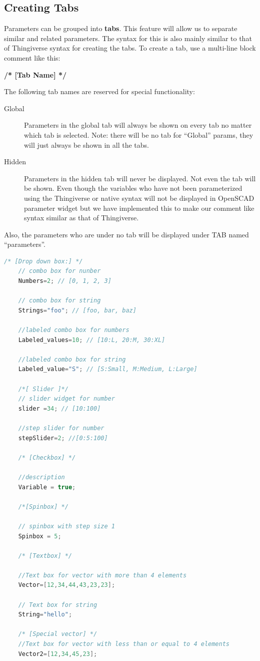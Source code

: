 \subsection{Creating Tabs}
Parameters can be grouped into \textbf{tabs}. This feature will allow us to separate similar and related parameters. The syntax for this is also mainly similar to that of Thingiverse syntax for creating the tabs. To create a tab, use a multi-line block comment like this:

\textbf{/* [Tab Name] */}

The following tab names are reserved for special functionality:
\begin{description}
\item [Global] Parameters in the global tab will always be shown on every tab no matter which tab is selected. Note: there will be no tab for “Global” params, they will just always be shown in all the tabs.

\item [Hidden] Parameters in the hidden tab will never be displayed. Not even the tab will be shown. Even though the variables who have not been parameterized using the Thingiverse or native syntax will not be displayed in OpenSCAD parameter widget but we have implemented this to make our comment like syntax similar as that of Thingiverse.
\end{description}

Also, the parameters who are under no tab will be displayed under TAB named “parameters”.
\begin{lstlisting}[language=c++]
    /* [Drop down box:] */
    // combo box for nunber
    Numbers=2; // [0, 1, 2, 3]
   
    // combo box for string
    Strings="foo"; // [foo, bar, baz]
   
    //labeled combo box for numbers
    Labeled_values=10; // [10:L, 20:M, 30:XL]
   
    //labeled combo box for string
    Labeled_value="S"; // [S:Small, M:Medium, L:Large]
   
    /*[ Slider ]*/
    // slider widget for number
    slider =34; // [10:100]
   
    //step slider for number
    stepSlider=2; //[0:5:100]
   
    /* [Checkbox] */
   
    //description
    Variable = true;
   
    /*[Spinbox] */
   
    // spinbox with step size 1
    Spinbox = 5;
   
    /* [Textbox] */
   
    //Text box for vector with more than 4 elements
    Vector=[12,34,44,43,23,23];
   
    // Text box for string
    String="hello";
   
    /* [Special vector] */
    //Text box for vector with less than or equal to 4 elements
    Vector2=[12,34,45,23];
\end{lstlisting}

